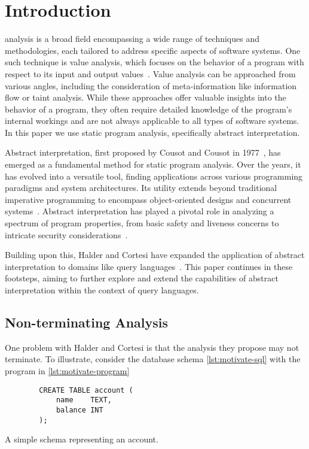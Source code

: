 \section{Introduction}\label{sec:introduction}
 analysis is a broad field encompassing a wide range of techniques and methodologies, each tailored to address specific aspects of software systems.
One such technique is value analysis, which focuses on the behavior of a program with respect to its input and output values~\cite{jackson_software_2000}.
Value analysis can be approached from various angles, including the consideration of meta-information like information flow or taint analysis.
While these approaches offer valuable insights into the behavior of a program, they often require detailed knowledge of the program's internal workings and are not always applicable to all types of software systems.
In this paper we use static program analysis, specifically abstract interpretation.

Abstract interpretation, first proposed by Cousot and Cousot in 1977~\cite{cousot_abstract_1977}, has emerged as a fundamental method for static program analysis.
Over the years, it has evolved into a versatile tool, finding applications across various programming paradigms and system architectures.
Its utility extends beyond traditional imperative programming to encompass object-oriented designs and concurrent systems~\cite{gustafsson_analyzing_2013, mine_static_2023}.
Abstract interpretation has played a pivotal role in analyzing a spectrum of program properties, from basic safety and liveness concerns to intricate security considerations~\cite{mastroeni_abstract_2011}.

Building upon this, Halder and Cortesi have expanded the application of abstract interpretation to domains like query languages~\cite{halder_abstract_2012}.
This paper continues in these footsteps, aiming to further explore and extend the capabilities of abstract interpretation within the context of query languages.


\subsection{Non-terminating Analysis}\label{subsec:non-terminating-analysis}
One problem with Halder and Cortesi is that the analysis they propose may not terminate.
To illustrate, consider the database schema \autoref{lst:motivate-sql} with the program in \autoref{lst:motivate-program}


\begin{listing}
    \begin{verbatim}
        CREATE TABLE account (
            name    TEXT,
            balance INT
        );
    \end{verbatim}
    \caption{A simple schema representing an account.}
    \label{lst:motivate-sql}
\end{listing}



